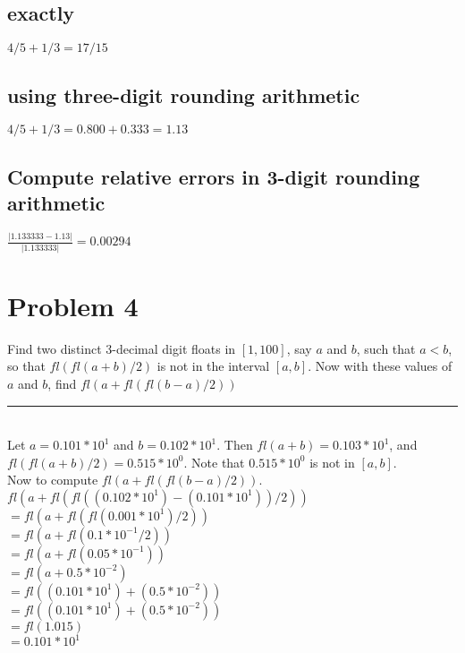 \documentclass[20pt]{article} %
\begin{document}
\subsection{exactly}
$4/5 + 1/3 = 17/15$
\subsection{using three-digit rounding arithmetic}
$4/5 + 1/3 = 0.800 + 0.333 = 1.13$
\subsection{Compute relative errors in 3-digit rounding arithmetic}
$\frac{|1.133333 - 1.13|}{|1.133333|} = 0.00294$

\section{Problem 4}
Find two distinct 3-decimal digit floats in $[1,100]$, say $a$ and $b$, such that $a < b$, so that $fl(fl(a+b)/2)$ is not in the interval $[a,b]$. Now with these values of $a$ and $b$, find $fl(a+fl(fl(b-a)/2))$
\noindent\rule{2cm}{0.4pt} \\

Let $a = 0.101 * 10^{1}$ and $b = 0.102 * 10^{1}$. Then $fl(a+b) = 0.103 * 10^{1}$, and $fl(fl(a+b)/2) = 0.515 * 10^{0}$.  Note that $0.515 * 10^{0}$ is not in $[a,b]$.\\
Now to compute $fl(a+fl(fl(b-a)/2))$. \\
$fl(a+ fl(fl((0.102 * 10^{1}) - ( 0.101 * 10^{1}))/2))$ \\
$=fl(a+ fl(fl(0.001*10^{1})/2))$ \\
$=fl(a+ fl(0.1*10^{-1}/2))$ \\
$=fl(a+ fl(0.05*10^{-1}))$ \\
$=fl(a+ 0.5*10^{-2})$ \\
$=fl((0.101*10^{1})+ (0.5*10^{-2}))$ \\
$=fl((0.101*10^{1})+ (0.5*10^{-2}))$ \\
$=fl(1.015)$ \\
$=0.101*10^{1}$ \\
\end{document}
